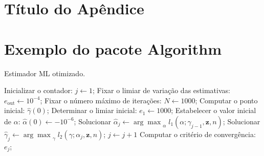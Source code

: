 \chapter{Título do Apêndice}
\label{Apx:A}




\chapter{Exemplo do pacote Algorithm}
\label{Apx:B}


\begin{algorithm}[!h]
\caption{Estimador ML otimizado.}\label{Alg:MAXVER}
\begin{algorithmic}[1]
\STATE Inicializar o contador: $j\leftarrow 1$;%
\STATE Fixar o limiar de variação das estimativas: $e_{\mathrm{out}}\leftarrow 10^{-4}$;%
\STATE Fixar o número máximo de iterações: $N\leftarrow 1000$;%
\STATE Computar o ponto inicial: $\hat \gamma(0)$;%
\STATE Determinar o limiar inicial: $e_1 \leftarrow1000$;%
\STATE Estabelecer o valor inicial de $\alpha$: $\hat \alpha(0) \leftarrow -10^{-6}$;%
    \STATE Solucionar $\hat \alpha_j\leftarrow {\arg \max}_{\alpha}\;{l_1(\alpha; \gamma_{j-1},\mathbf{z},n)}$;%
    \STATE Solucionar $\hat \gamma_j\leftarrow {\arg \max}_{\gamma}\;{l_2(\gamma; \alpha_j,\mathbf{z},n)}$;%
    \STATE $j\leftarrow j+1$
    \STATE Computar o critério de convergência: $e_j$;%
\ENDWHILE
\end{algorithmic}
\end{algorithm}